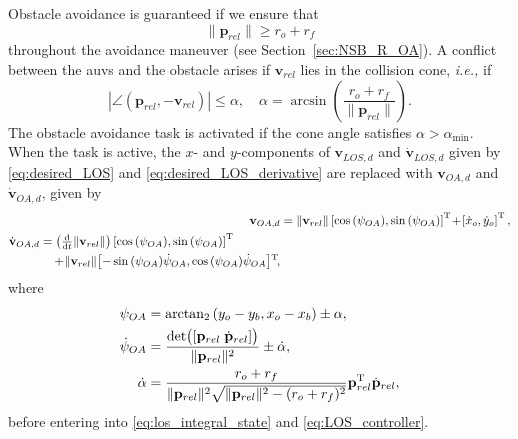 Obstacle avoidance is guaranteed if we ensure that
\begin{equation}
    \|\mathbf{p}_{rel}\| \geq r_o + r_f
    \label{eq:obstacle_avoidance_condition}
\end{equation}
throughout the avoidance maneuver (see Section~\ref{sec:NSB_R_OA}).
A conflict between the \glspl{auv} and the obstacle arises if $\mathbf{v}_{rel}$ lies in the collision cone, \emph{i.e.,} if
\begin{equation}
    |\angle (\mathbf{p}_{rel}, -\mathbf{v}_{rel})| \leq \alpha ,\quad \alpha = \arcsin\left(\frac{r_o+r_f}{\|\mathbf{p}_{rel}\|}\right).
    \label{eq:collision-conflict}
\end{equation}
The obstacle avoidance task is activated if the cone angle satisfies $\alpha > \alpha_{\min}$. 
When the task is active, the $x$- and $y$-components of  $\mathbf{v}_{LOS,d}$ and $\dot{\mathbf{v}}_{LOS,d}$  given by \eqref{eq:desired_LOS} and \eqref{eq:desired_LOS_derivative} are replaced with $\mathbf{v}_{OA,d}$ and $\dot{\mathbf{v}}_{OA,d}$, given by
\begin{align}
    \mathbf{v}_{OA,d} &= \|\mathbf{v}_{rel}\| \left[\cos{(\psi_{OA})}, \sin{(\psi_{OA})}\right]\T \!+\! \left[\dot{x}_o, \dot{y}_o \right]\T,\label{eq:v_OA}\\
    \begin{split}\label{eq:v_OA_dot}
    \dot{\mathbf{v}}_{OA,d} &= \left(\scale[1]{\frac{\rm d}{{\rm d}t}}\|\mathbf{v}_{rel}\|\right)\left[ \cos{(\psi_{OA})}, \sin{(\psi_{OA})}\right]\T \\ & \quad + \!\|\mathbf{v}_{rel}\|\!\left[ -\sin{(\psi_{OA})}\dot{\psi}_{OA}, \cos{(\psi_{OA})} \dot{\psi}_{OA}\right]\!\T\!,
    \end{split}
\end{align}
where
\begin{align}
    \psi_{OA} &= \mathrm{arctan}_2 \left(y_o-y_b, x_o-x_b\right) \pm \alpha,\\
    \dot{\psi}_{OA} &= \frac{\mathrm{det}\bigl([\mathbf{p}_{rel}\; \dot{\mathbf{p}}_{rel}]\bigr)}{\|\mathbf{p}_{rel}\|^2} \pm \dot{\alpha},\\
    \dot{\alpha} &= \frac{r_o+r_f}{\|\mathbf{p}_{rel}\|^2\sqrt{\|\mathbf{p}_{rel}\|^2-(r_o+r_f)^2}}\mathbf{p}_{rel}^{\mathrm{T}} \dot{\mathbf{p}}_{rel},
\end{align}
 before entering into \eqref{eq:los_integral_state} and \eqref{eq:LOS_controller}.
 

